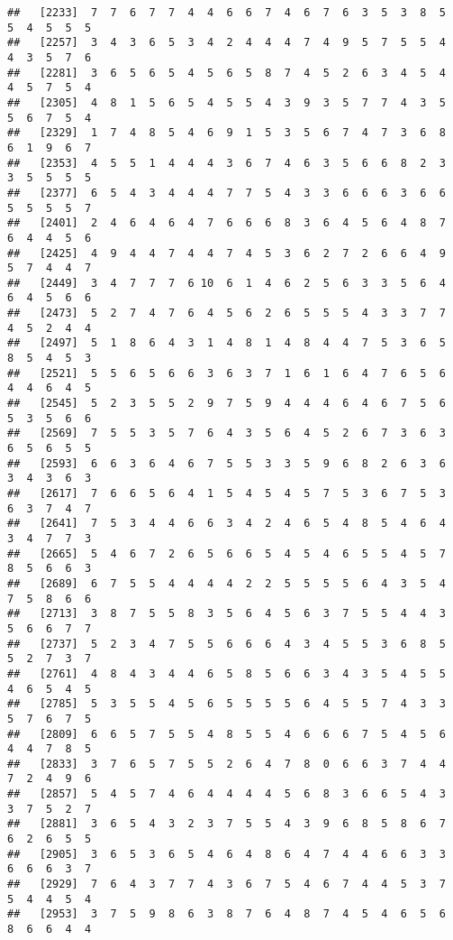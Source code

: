 \documentclass[
]{book}
\begin{document}
\begin{verbatim}
##   [2233]  7  7  6  7  7  4  4  6  6  7  4  6  7  6  3  5  3  8  5  5  4  5  5  5
##   [2257]  3  4  3  6  5  3  4  2  4  4  4  7  4  9  5  7  5  5  4  4  3  5  7  6
##   [2281]  3  6  5  6  5  4  5  6  5  8  7  4  5  2  6  3  4  5  4  4  5  7  5  4
##   [2305]  4  8  1  5  6  5  4  5  5  4  3  9  3  5  7  7  4  3  5  5  6  7  5  4
##   [2329]  1  7  4  8  5  4  6  9  1  5  3  5  6  7  4  7  3  6  8  6  1  9  6  7
##   [2353]  4  5  5  1  4  4  4  3  6  7  4  6  3  5  6  6  8  2  3  3  5  5  5  5
##   [2377]  6  5  4  3  4  4  4  7  7  5  4  3  3  6  6  6  3  6  6  5  5  5  5  7
##   [2401]  2  4  6  4  6  4  7  6  6  6  8  3  6  4  5  6  4  8  7  6  4  4  5  6
##   [2425]  4  9  4  4  7  4  4  7  4  5  3  6  2  7  2  6  6  4  9  5  7  4  4  7
##   [2449]  3  4  7  7  7  6 10  6  1  4  6  2  5  6  3  3  5  6  4  6  4  5  6  6
##   [2473]  5  2  7  4  7  6  4  5  6  2  6  5  5  5  4  3  3  7  7  4  5  2  4  4
##   [2497]  5  1  8  6  4  3  1  4  8  1  4  8  4  4  7  5  3  6  5  8  5  4  5  3
##   [2521]  5  5  6  5  6  6  3  6  3  7  1  6  1  6  4  7  6  5  6  4  4  6  4  5
##   [2545]  5  2  3  5  5  2  9  7  5  9  4  4  4  6  4  6  7  5  6  5  3  5  6  6
##   [2569]  7  5  5  3  5  7  6  4  3  5  6  4  5  2  6  7  3  6  3  6  5  6  5  5
##   [2593]  6  6  3  6  4  6  7  5  5  3  3  5  9  6  8  2  6  3  6  3  4  3  6  3
##   [2617]  7  6  6  5  6  4  1  5  4  5  4  5  7  5  3  6  7  5  3  6  3  7  4  7
##   [2641]  7  5  3  4  4  6  6  3  4  2  4  6  5  4  8  5  4  6  4  3  4  7  7  3
##   [2665]  5  4  6  7  2  6  5  6  6  5  4  5  4  6  5  5  4  5  7  8  5  6  6  3
##   [2689]  6  7  5  5  4  4  4  4  2  2  5  5  5  5  6  4  3  5  4  7  5  8  6  6
##   [2713]  3  8  7  5  5  8  3  5  6  4  5  6  3  7  5  5  4  4  3  5  6  6  7  7
##   [2737]  5  2  3  4  7  5  5  6  6  6  4  3  4  5  5  3  6  8  5  5  2  7  3  7
##   [2761]  4  8  4  3  4  4  6  5  8  5  6  6  3  4  3  5  4  5  5  4  6  5  4  5
##   [2785]  5  3  5  5  4  5  6  5  5  5  5  6  4  5  5  7  4  3  3  5  7  6  7  5
##   [2809]  6  6  5  7  5  5  4  8  5  5  4  6  6  6  7  5  4  5  6  4  4  7  8  5
##   [2833]  3  7  6  5  7  5  5  2  6  4  7  8  0  6  6  3  7  4  4  7  2  4  9  6
##   [2857]  5  4  5  7  4  6  4  4  4  4  5  6  8  3  6  6  5  4  3  3  7  5  2  7
##   [2881]  3  6  5  4  3  2  3  7  5  5  4  3  9  6  8  5  8  6  7  6  2  6  5  5
##   [2905]  3  6  5  3  6  5  4  6  4  8  6  4  7  4  4  6  6  3  3  6  6  6  3  7
##   [2929]  7  6  4  3  7  7  4  3  6  7  5  4  6  7  4  4  5  3  7  5  4  4  5  4
##   [2953]  3  7  5  9  8  6  3  8  7  6  4  8  7  4  5  4  6  5  6  8  6  6  4  4

\end{verbatim}
\end{document}
